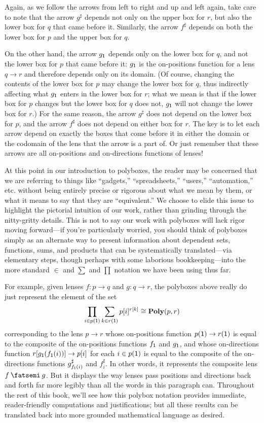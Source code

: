 \documentclass[Book-Poly]{subfiles}
\begin{document}
Again, as we follow the arrows from left to right and up and left again, take care to note that the arrow $g^\sharp$ depends not only on the upper box for $r$, but also the lower box for $q$ that came before it.
Similarly, the arrow $f^\sharp$ depends on both the lower box for $p$ and the upper box for $q$.

On the other hand, the arrow $g_{\textsf{1}}$ depends only on the lower box for $q$, and not the lower box for $p$ that came before it: $g_{\textsf{1}}$ is the on-positions function for a lens $q\to r$ and therefore depends only on its domain. (Of course, changing the contents of the lower box for $p$ may change the lower box for $q$, thus indirectly affecting what $g_{\textsf{1}}$ enters in the lower box for $r$; what we mean is that if the lower box for $p$ changes but the lower box for $q$ does not, $g_{\textsf{1}}$ will not change the lower box for $r$.)
For the same reason, the arrow $g^\sharp$ does not depend on the lower box for $p$, and the arrow $f^\sharp$ does not depend on either box for $r$.
The key is to let each arrow depend on exactly the boxes that come before it in either the domain or the codomain of the lens that the arrow is a part of.
Or just remember that these arrows are all on-positions and on-directions functions of lenses!

\begin{remark}
At this point in our introduction to polyboxes, the reader may be concerned that we are referring to things like ``gadgets,'' ``spreadsheets,'' ``users,'' ``automation,'' etc. without being entirely precise or rigorous about what we mean by them, or what it means to say that they are ``equivalent.''
We choose to elide this issue to highlight the pictorial intuition of our work, rather than grinding through the nitty-gritty details.
This is not to say our work with polyboxes will lack rigor moving forward---if you're particularly worried, you should think of polyboxes simply as an alternate way to present information about dependent sets, functions, sums, and products that can be systematically translated---via elementary steps, though perhaps with some laborious bookkeeping---into the more standard $\in$ and $\sum$ and $\prod$ notation we have been using thus far.

For example, given lenses $f\colon p\to q$ and $g\colon q\to r$, the polyboxes above really do just represent the element of the set
\[
    \prod_{i\in p(\textsf{1})}\sum_{k\in r(\textsf{1})}p[i]^{r[k]}\cong\mathbf{Poly}(p,r)
\]
corresponding to the lens $p\to r$ whose on-positions function $p(\textsf{1})\to r(\textsf{1})$ is equal to the composite of the on-positions functions $f_{\textsf{1}}$ and $g_{\textsf{1}}$, and whose on-directions function $r[g_{\textsf{1}}(f_{\textsf{1}}(i))]\to p[i]$ for each $i\in p(\textsf{1})$ is equal to the composite of the on-directions functions $g^\sharp_{f_{\textsf{1}}(i)}$ and $f^\sharp_i$.
In other words, it represents the composite lens $f\then g$.
But it displays the way lenses pass positions and directions back and forth far more legibly than all the words in this paragraph can.
Throughout the rest of this book, we'll see how this polybox notation provides immediate, reader-friendly computations and justifications; but all these results can be translated back into more grounded mathematical language as desired.
\end{remark}
\end{document}
